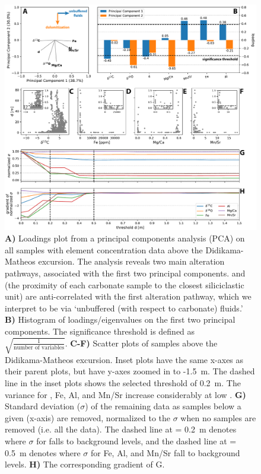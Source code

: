 \begin{figure}[!htbp]
\begin{center}
	\includegraphics[width=\textwidth]{figures/Tambien/siliciclastic-filtering.pdf}
	\caption[Principal components analysis on geochemical data.]{\textbf{A)} Loadings plot from a principal components analysis (PCA) on all samples with element concentration data above the Didikama-Matheos excursion. The analysis reveals two main alteration pathways, associated with the first two principal components. \dC and \dsil (the proximity of each carbonate sample to the closest siliciclastic unit) are anti-correlated with the first alteration pathway, which we interpret to be via `unbuffered (with respect to carbonate) fluids.' \textbf{B)} Histogram of loadings/eigenvalues on the first two principal components. The significance threshold is defined as $\sqrt{\frac{1}{\text{number of variables}}}$. \textbf{C-F)} Scatter plots of samples above the Didikama-Matheos excursion. Inset plots have the same x-axes as their parent plots, but have y-axes zoomed in to -1.5~m. The dashed line in the inset plots shows the selected \dsil threshold of 0.2~m. The variance for \dC, Fe, Al, and Mn/Sr increase considerably at low \dsil. \textbf{G)} Standard deviation ($\sigma$) of the remaining data as samples below a given \dsil (x-axis) are removed, normalized to the $\sigma$ when no samples are removed (i.e. all the data). The dashed line at \dsil = 0.2~m denotes where $\sigma$ for \dC falls to background levels, and the dashed line at \dsil = 0.5~m denotes where $\sigma$ for Fe, Al, and Mn/Sr fall to background levels. \textbf{H)} The corresponding gradient of G.}
	\label{fig:siliciclastic-filtering}
\end{center}
\end{figure}

